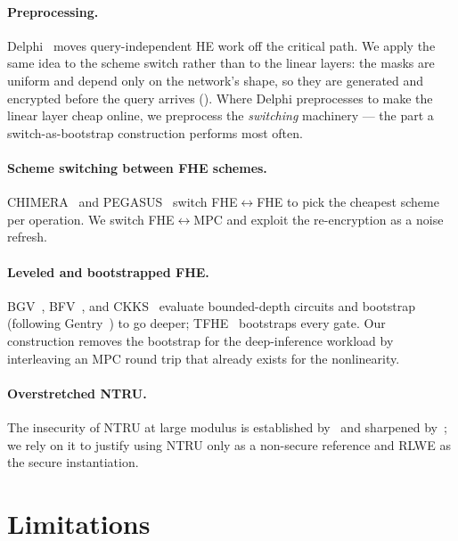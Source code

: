 \documentclass[11pt]{article}
\theoremstyle{plain}
\theoremstyle{definition}
\theoremstyle{remark}
\begin{document}
\paragraph{Preprocessing.} Delphi~\cite{Delphi} moves query-independent HE
work off the critical path. We apply the same idea to the scheme switch
rather than to the linear layers: the masks are uniform and depend only on
the network's shape, so they are generated and encrypted before the query
arrives (). Where Delphi preprocesses to make the linear
layer cheap online, we preprocess the \emph{switching} machinery --- the part
a switch-as-bootstrap construction performs most often.

\paragraph{Scheme switching between FHE schemes.} CHIMERA~\cite{CHIMERA} and
PEGASUS~\cite{PEGASUS} switch FHE$\leftrightarrow$FHE to pick the cheapest
scheme per operation. We switch FHE$\leftrightarrow$MPC and exploit the
re-encryption as a noise refresh.

\paragraph{Leveled and bootstrapped FHE.} BGV~\cite{BGV}, BFV~\cite{FV}, and
CKKS~\cite{CKKS} evaluate bounded-depth circuits and bootstrap (following
Gentry~\cite{Gentry}) to go deeper; TFHE~\cite{TFHE} bootstraps every gate.
Our construction removes the bootstrap for the deep-inference workload by
interleaving an MPC round trip that already exists for the nonlinearity.

\paragraph{Overstretched NTRU.} The insecurity of NTRU at large modulus is
established by~\cite{ABDucas,KirchnerFouque} and sharpened
by~\cite{DucasvanWoerden}; we rely on it to justify using NTRU only as a
non-secure reference and RLWE as the secure instantiation.

\section{Limitations}\label{sec:limitations}
\end{document}
